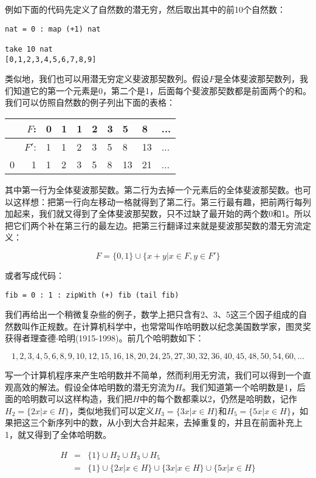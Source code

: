 \documentclass{article}
\begin{document}
例如下面的代码先定义了自然数的潜无穷，然后取出其中的前10个自然数：

\lstset{frame=single}
\begin{lstlisting}
nat = 0 : map (+1) nat

take 10 nat
[0,1,2,3,4,5,6,7,8,9]
\end{lstlisting}

类似地，我们也可以用潜无穷定义斐波那契数列。假设$F$是全体斐波那契数列，我们知道它的第一个元素是0，第二个是1，后面每个斐波那契数都是前面两个的和。我们可以仿照自然数的例子列出下面的表格：

\begin{tabular}{|r|r|l|l|l|l|l|l|l|l|}
\hline
  & $F$:  & 0 & 1 & 1 & 2 & 3 & 5 & 8 & ... \\
\hline
  & $F'$: & 1 & 1 & 2 & 3 & 5 & 8 & 13 & ... \\
\hline
0 & 1     & 1 & 2 & 3 & 5 & 8 & 13 & 21 & ... \\
\hline
\end{tabular}

其中第一行为全体斐波那契数。第二行为去掉一个元素后的全体斐波那契数。也可以这样想：把第一行向左移动一格就得到了第二行。第三行最有趣，把前两行每列加起来，我们就又得到了全体斐波那契数，只不过缺了最开始的两个数0和1。所以把它们两个补在第三行的最左边。把第三行翻译过来就是斐波那契数的潜无穷流定义：

\[
F = \{0, 1\} \cup \{ x + y | x \in F, y \in F'\}
\]

或者写成代码：
\begin{lstlisting}
fib = 0 : 1 : zipWith (+) fib (tail fib)
\end{lstlisting}

 
我们再给出一个稍微复杂些的例子，数学上把只含有2、3、5这三个因子组成的自然数叫作正规数。在计算机科学中，也常常叫作哈明数以纪念美国数学家，图灵奖获得者理查德$\cdot$哈明(1915-1998)。前几个哈明数如下：

\[
1, 2, 3, 4, 5, 6, 8, 9, 10, 12, 15, 16, 18, 20, 24, 25, 27, 30, 32, 36, 40, 45, 48, 50, 54, 60, ...
\]

写一个计算机程序来产生哈明数并不简单，然而利用无穷流，我们可以得到一个直观高效的解法。假设全体哈明数的潜无穷流为$H$。我们知道第一个哈明数是1，后面的哈明数可以这样构造，我们把$H$中的每个数都乘以2，仍然是哈明数，记作$H_2 = \{ 2x | x \in H \}$，类似地我们可以定义$H_3 = \{ 3x | x \in H \}$和$H_5 = \{ 5x | x \in H \}$，如果把这三个新序列中的数，从小到大合并起来，去掉重复的，并且在前面补充上1，就又得到了全体哈明数。

\[
\begin{array}{rcl}
H & = & \{ 1 \} \cup H_2 \cup H_3 \cup H_5 \\
  & = & \{ 1 \} \cup \{ 2x | x \in H \} \cup \{ 3x | x \in H \} \cup \{ 5x | x \in H \} \\
\end{array}
\]
\end{document}
